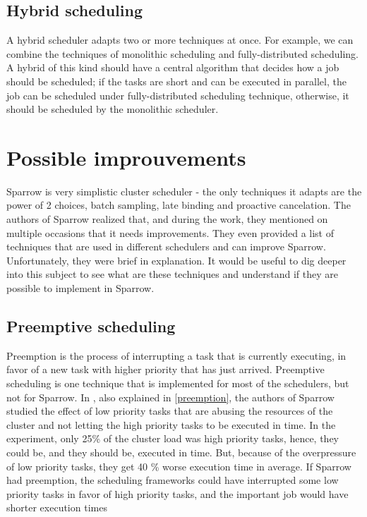 \documentclass[11pt]{article}
\begin{document}
    \subsection{Hybrid scheduling}
    
        A hybrid scheduler adapts two or more techniques at once. For example, we can combine the techniques of monolithic scheduling and fully-distributed scheduling. A hybrid of this kind should have a central algorithm that decides how a job should be scheduled; if the tasks are short and can be executed in parallel, the job can be scheduled under fully-distributed scheduling technique, otherwise, it should be scheduled by the monolithic scheduler.


\section{Possible improuvements}

	Sparrow is very simplistic cluster scheduler - the only techniques it adapts are the power of 2 choices, batch sampling, late binding and proactive cancelation. The authors of Sparrow realized that, and during the work, they mentioned on multiple occasions that it needs improvements. They even provided a list of techniques \cite[section 8]{sparrow} that are used in different schedulers and can improve Sparrow. Unfortunately, they were brief in explanation. It would be useful to dig deeper into this subject to see what are these techniques and understand if they are possible to implement in Sparrow.
	
	\subsection{Preemptive scheduling}
	
		Preemption is the process of interrupting a task that is currently executing, in favor of a new task with higher priority that has just arrived. Preemptive scheduling is one technique that is implemented for most of the schedulers, but not for Sparrow. In \cite[subsection 7.8]{sparrow}, also explained in \ref{preemption}, the authors of Sparrow studied the effect of low priority tasks that are abusing the resources of the cluster and not letting the high priority tasks to be executed in time. In the experiment, only 25\% of the cluster load was high priority tasks, hence, they could be, and they should be, executed in time. But, because of the overpressure of low priority tasks, they get 40 \% worse execution time in average. If Sparrow had preemption, the scheduling frameworks could have interrupted some low priority tasks in favor of high priority tasks, and the important job would have shorter execution times
		
\end{document}

